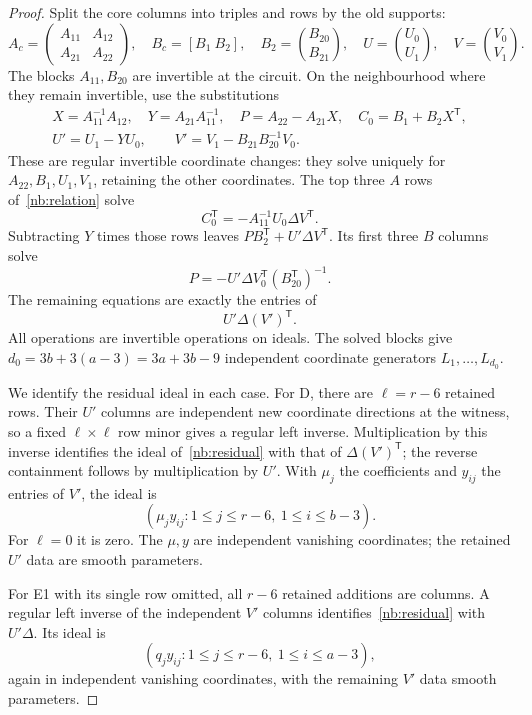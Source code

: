 \begin{proof}
Split the core columns into triples and rows by the old supports:
\[
 A_c=\begin{pmatrix}A_{11}&A_{12}\\ A_{21}&A_{22}\end{pmatrix},
 \quad B_c=[B_1\ B_2],\quad B_2=\binom{B_{20}}{B_{21}},
 \quad U=\binom{U_0}{U_1},\quad V=\binom{V_0}{V_1}.
\]
The blocks $A_{11},B_{20}$ are invertible at the circuit. On the
neighbourhood where they remain invertible, use the substitutions
\begin{equation}\label{nb:schur}
 \begin{gathered}
 X=A_{11}^{-1}A_{12},\quad Y=A_{21}A_{11}^{-1},\quad
 P=A_{22}-A_{21}X,\quad C_0=B_1+B_2X^{\mathsf T},\\
 U'=U_1-YU_0,\qquad V'=V_1-B_{21}B_{20}^{-1}V_0.
 \end{gathered}
\end{equation}
These are regular invertible coordinate changes: they solve uniquely
for $A_{22},B_1,U_1,V_1$, retaining the other coordinates. The top
three $A$ rows of~\eqref{nb:relation} solve
\[
 C_0^{\mathsf T}=-A_{11}^{-1}U_0\Delta V^{\mathsf T}.
\]
Subtracting $Y$ times those rows leaves
$PB_2^{\mathsf T}+U'\Delta V^{\mathsf T}$. Its first three $B$
columns solve
\[
 P=-U'\Delta V_0^{\mathsf T}(B_{20}^{\mathsf T})^{-1}.
\]
The remaining equations are exactly the entries of
\begin{equation}\label{nb:residual}
 U'\Delta(V')^{\mathsf T}.
\end{equation}
All operations are invertible operations on ideals. The solved
blocks give $d_0=3b+3(a-3)=3a+3b-9$ independent coordinate
generators $L_1,\ldots,L_{d_0}$.

We identify the residual ideal in each case. For D, there are
$\ell=r-6$ retained rows. Their $U'$ columns are independent new
coordinate directions at the witness, so a fixed $\ell\times\ell$
row minor gives a regular left inverse. Multiplication by this inverse
identifies the ideal of~\eqref{nb:residual} with that of
$\Delta(V')^{\mathsf T}$; the reverse containment follows by
multiplication by $U'$. With $\mu_j$ the coefficients and $y_{ij}$
the entries of $V'$, the ideal is
\begin{equation}\label{nb:row-residual}
 (\mu_jy_{ij}:1\leq j\leq r-6,\ 1\leq i\leq b-3).
\end{equation}
For $\ell=0$ it is zero. The $\mu,y$ are independent vanishing
coordinates; the retained $U'$ data are smooth parameters.

For E1 with its single row omitted, all $r-6$ retained additions
are columns. A regular left inverse of the independent $V'$ columns
identifies~\eqref{nb:residual} with $U'\Delta$. Its ideal is
\begin{equation}\label{nb:column-residual}
 (q_jy_{ij}:1\leq j\leq r-6,\ 1\leq i\leq a-3),
\end{equation}
again in independent vanishing coordinates, with the remaining
$V'$ data smooth parameters.


\end{proof}
